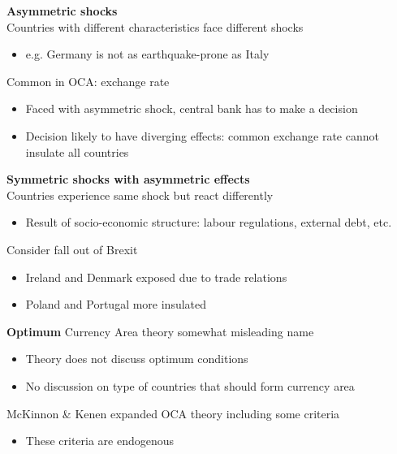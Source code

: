 \documentclass{beamer}
\begin{document}
\begin{frame}
  \textbf{Asymmetric shocks}\\
  \medskip
  Countries with different characteristics face different shocks  
  \begin{itemize}
    \item e.g. Germany is not as earthquake-prone as Italy
  \end{itemize}
  \medskip
   Common in OCA: exchange rate  
  \begin{itemize}
    \item Faced with asymmetric shock, central bank has to make a decision
    \item Decision likely to have diverging effects: common exchange rate cannot insulate all countries
  \end{itemize}
\end{frame}

\begin{frame}
  \textbf{Symmetric shocks with asymmetric effects}\\
  \medskip
  Countries experience same shock but react differently
  \begin{itemize}
    \item Result of socio-economic structure: labour regulations, external debt, etc.
  \end{itemize}
  \medskip
  Consider fall out of Brexit
  \begin{itemize}
    \item Ireland and Denmark exposed due to trade relations
    \item Poland and Portugal more insulated
  \end{itemize}
\end{frame}

\begin{frame}
  \textbf{Optimum} Currency Area theory somewhat misleading name
  \begin{itemize}
    \item Theory does not discuss optimum conditions
    \item No discussion on type of countries that should form currency area
  \end{itemize}
  \medskip
  McKinnon \& Kenen expanded OCA theory including some criteria
  \begin{itemize}
    \item These criteria are endogenous
  \end{itemize}
\end{frame}
\end{document}
